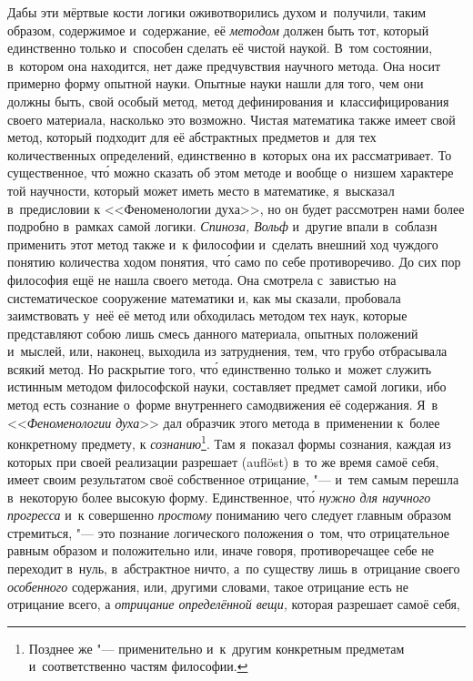Дабы эти мёртвые кости логики оживотворились духом и~получили, таким
образом, содержимое и~содержание, её {\em методом}
должен быть тот, который единственно только и~способен сделать её чистой
наукой. В~том состоянии, в~котором она находится, нет даже предчувствия
научного метода. Она носит примерно форму опытной науки. Опытные науки
нашли для того, чем они должны быть, свой особый метод, метод дефинирования
и~классифицирования своего материала, насколько это возможно. Чистая
математика также имеет свой метод, который подходит для её абстрактных
предметов и~для тех количественных определений, единственно в~которых она
их рассматривает. То существенное, чт\'{о} можно сказать об этом методе и
вообще о~низшем характере той научности, который может иметь место в
математике, я~высказал в~предисловии к <<Феноменологии духа>>, но он будет
рассмотрен нами более подробно в~рамках самой логики.
{\em Спиноза, Вольф} и~другие
впали в~соблазн применить этот метод также и~к философии и~сделать внешний
ход чуждого понятию количества ходом понятия, чт\'{о} само по себе
противоречиво. До сих пор философия ещё не нашла своего метода. Она
смотрела с~завистью на систематическое сооружение математики и, как мы
сказали, пробовала заимствовать у~неё её метод или обходилась методом тех
наук, которые представляют собою лишь смесь данного материала, опытных
положений и~мыслей, или, наконец, выходила из затруднения, тем, что грубо
отбрасывала всякий метод. Но раскрытие того, чт\'{о} единственно только и~может
служить истинным методом философской науки, составляет предмет самой
логики, ибо метод есть сознание о~форме внутреннего самодвижения её
содержания. Я~в <<{\em Феноменологии духа}>> дал образчик
этого метода в~применении к~более конкретному предмету, к
{\em сознанию}\footnote{Позднее же "--- применительно
и~к~другим конкретным предметам и~соответственно частям философии.}.
Там я~показал формы сознания, каждая из которых при своей реализации разрешает
(auf\-löst) в~то же время самоё себя, имеет своим результатом своё собственное
отрицание, "--- и~тем самым перешла в~некоторую более высокую форму.
Единственное, чт\'{о} {\em нужно для научного прогресса} и~к совершенно
{\em простому} пониманию чего следует главным образом стремиться, "--- это
познание логического положения о~том, что отрицательное равным образом и
положительно или, иначе говоря, противоречащее себе не переходит в~нуль,
в~абстрактное ничто, а~по существу лишь в~отрицание своего {\em особенного}
содержания, или, другими словами, такое отрицание есть не отрицание всего,
а {\em отрицание определённой вещи,} которая разрешает самоё себя,
